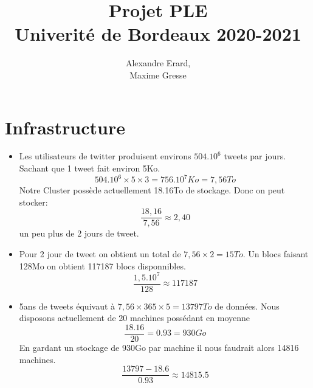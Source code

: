 \documentclass[a4paper]{article}
\title{Projet PLE \\ Univerité de Bordeaux 2020-2021}
\author{
    Alexandre Erard, \\
    Maxime Gresse
    }
\begin{document}
\maketitle
\section{Infrastructure}
\begin{itemize}
    \item Les utilisateurs de twitter produisent environs $504.10^6$ tweets par jours. Sachant que 1 tweet fait environ 5Ko.
    \[ 504.10^6 \times 5 \times 3 = 756.10^7 Ko = 7,56 To\]
    Notre Cluster possède actuellement 18.16To de stockage. Donc on peut stocker:
    \[  \frac{18,16}{7,56} \approx 2,40\]
    un peu plus de 2 jours de tweet.
    
    \item Pour 2 jour de tweet on obtient un total de $7,56 \times 2 = 15To$. Un blocs faisant 128Mo on obtient 117187 blocs disponnibles.
    \[ \frac{1,5.10^7}{128} \approx 117187\]

    \item 5ans de tweets équivaut à  $7,56 \times 365 \times 5 = 13797To $ de données.
    Nous disposons actuellement de 20 machines possédant en moyenne 
    \[\frac{18.16}{20} = 0.93 = 930Go\]
    En gardant un stockage de 930Go par machine il nous faudrait alors 14816 machines.
    \[ \frac{13797-18.6}{0.93} \approx 14815.5\]
    

\end{itemize}
\end{document}
